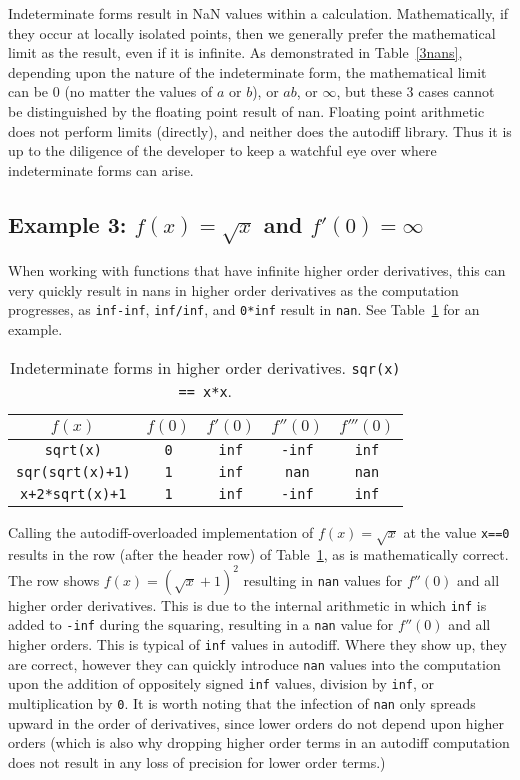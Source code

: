 \documentclass{article}
\begin{document}
Indeterminate forms result in NaN values within a calculation. Mathematically, if they occur at locally isolated
points, then we generally prefer the mathematical limit as the result, even if it is infinite. As demonstrated in
Table~\ref{3nans}, depending upon the nature of the indeterminate form, the mathematical limit can be 0 (no matter
the values of $a$ or $b$), or $ab$, or $\infty$, but these 3 cases cannot be distinguished by the floating point
result of nan. Floating point arithmetic does not perform limits (directly), and neither does the autodiff library.
Thus it is up to the diligence of the developer to keep a watchful eye over where indeterminate forms can arise.

\subsection{Example 3: $f(x)=\sqrt x$ and $f'(0)=\infty$}

When working with functions that have infinite higher order derivatives, this can very quickly result in nans in
higher order derivatives as the computation progresses, as {\tt inf-inf}, {\tt inf/inf}, and {\tt 0*inf} result
in {\tt nan}. See Table~\ref{sqrtnan} for an example.

\begin{table}[h]
\centering\begin{tabular}{c||c|c|c|c}
$f(x)$ & $f(0)$ & $f'(0)$ & $f''(0)$ & $f'''(0)$ \\
\hline\hline
{\tt sqrt(x)} & {\tt 0} & {\tt inf} & {\tt -inf} & {\tt inf} \\
\hline
{\tt sqr(sqrt(x)+1)} & {\tt 1} & {\tt inf} & {\tt nan} & {\tt nan} \\
\hline
{\tt x+2*sqrt(x)+1} & {\tt 1} & {\tt inf} & {\tt -inf}& {\tt inf}
\end{tabular}
\caption{Indeterminate forms in higher order derivatives. {\tt sqr(x) == x*x}.}\label{sqrtnan}
\end{table}

Calling the autodiff-overloaded implementation of $f(x)=\sqrt x$ at the value {\tt x==0} results in the
 row (after the header row) of Table~\ref{sqrtnan}, as is mathematically correct. The  row shows
$f(x)=(\sqrt{x}+1)^2$ resulting in {\tt nan} values for $f''(0)$ and all higher order derivatives. This is due to
the internal arithmetic in which {\tt inf} is added to {\tt -inf} during the squaring, resulting in a {\tt nan}
value for $f''(0)$ and all higher orders. This is typical of {\tt inf} values in autodiff. Where they show up,
they are correct, however they can quickly introduce {\tt nan} values into the computation upon the addition of
oppositely signed {\tt inf} values, division by {\tt inf}, or multiplication by {\tt 0}. It is worth noting that
the infection of {\tt nan} only spreads upward in the order of derivatives, since lower orders do not depend upon
higher orders (which is also why dropping higher order terms in an autodiff computation does not result in any
loss of precision for lower order terms.)
\end{document}
